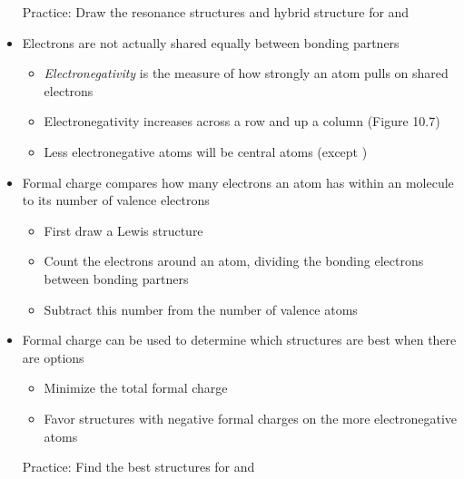 \documentclass[12pt, openany, letterpaper]{memoir}
\begin{document}
\begin{itemize}
	      Practice: Draw the resonance structures and hybrid structure for  and 
	\item Electrons are not actually shared equally between bonding partners
	      \begin{itemize}
		      \item \emph{Electronegativity} is the measure of how strongly an atom pulls on shared electrons
		      \item Electronegativity increases across a row and up a column (Figure 10.7)
		      \item Less electronegative atoms will be central atoms (except )
	      \end{itemize}
	\item Formal charge compares how many electrons an atom has within an molecule to its number of valence electrons
	      \begin{itemize}
		      \item First draw a Lewis structure
		      \item Count the electrons around an atom, dividing the bonding electrons between bonding partners
		      \item Subtract this number from the number of valence atoms
	      \end{itemize}
	\item Formal charge can be used to determine which structures are best when there are options
	      \begin{itemize}
		      \item Minimize the total formal charge
		      \item Favor structures with negative formal charges on the more electronegative atoms
	      \end{itemize}

	      Practice: Find the best structures for  and 
\end{itemize}
\end{document}
